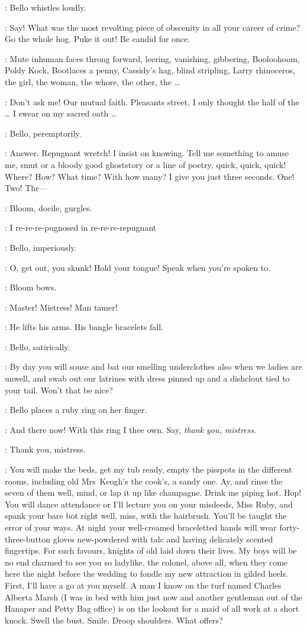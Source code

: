 :
Bello whistles loudly.

\Bello:
Say!
What was the most revolting piece of obscenity in all your career of crime?
Go the whole hog.
Puke it out!
Be candid for once.

:
Mute inhuman faces throng forward, leering, vanishing, gibbering, Boo\-loo\-hoom,
Poldy Kock, Bootlaces a penny, Cassidy's hag, blind stripling,
Larry rhinoceros, the girl, the woman, the whore, the other, the \ldots

\Bloom:
Don't ask me!
Our mutual faith.
Pleasants street.
I only thought the half of the \ldots
I swear on my sacred oath \ldots%

:
Bello, peremptorily.

\Bello:
Answer.
Repugnant wretch!
I insist on knowing.
Tell me something to amuse me, smut or a bloody good ghoststory
or a line of poetry, quick, quick, quick!
Where? How?
What time?
With how many?
I give you just three seconds.
One! Two! Thr---

:
Bloom, docile, gurgles.

\Bloom:
I re-re-re-pugnosed in re-re-re-repugnant

:
Bello, imperiously.

\Bello:
O, get out, you skunk!
Hold your tongue!
Speak when you're spoken to.%

:
Bloom bows.

\Bloom:
Master!
Mistress!
Man tamer!

:
He lifts his arms.
His bangle bracelets fall.

:
Bello, satirically.

\Bello:
By day you will souse and bat our smelling underclothes
also when we ladies are unwell, and swab out our latrines
with dress pinned up and a dishclout tied to your tail.
Won't that be nice?

:
Bello places a ruby ring on her finger.

\Bello:
And there now!
With this ring I thee own.
Say, \emph{thank you, mistress}.

\Bloom:
Thank you, mistress.

\Bello:
You will make the beds, get my tub ready,
empty the pisspots in the different rooms,
including old Mrs~Keogh's the cook's, a sandy one.
Ay, and rinse the seven of them well, mind, or lap it up like champagne.
Drink me piping hot.
Hop!
You will dance attendance or I'll lecture you on your misdeeds,
Miss Ruby, and spank your bare bot right well, miss,
with the hairbrush.
You'll be taught the error of your ways.
At night your well-creamed braceletted hands will wear forty-three-button gloves
new-powdered with talc and having delicately scented fingertips.
For such favours, knights of old laid down their lives.
My boys will be no end charmed to see you so ladylike,
the colonel, above all,
when they come here the night before the wedding
to fondle my new attraction in gilded heels.
First, I'll have a go at you myself.
A man I know on the turf named Charles Alberta Marsh
(I was in bed with him just now
and another gentleman out of the Hanaper and Petty Bag office)
is on the lookout for a maid of all work at a short knock.
Swell the bust.
Smile.
Droop shoulders.
What offers?

